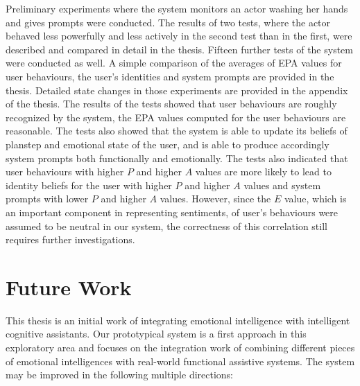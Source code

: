 Preliminary experiments where the system monitors an actor washing her hands and gives prompts were conducted. The results of two tests, where the actor behaved less powerfully and less actively in the second test than in the first, were described and compared in detail in the thesis. Fifteen further tests of the system were conducted as well. A simple comparison of the averages of EPA values for user behaviours, the user's identities and system prompts are provided in the thesis. Detailed state changes in those experiments are provided in the appendix of the thesis. The results of the tests showed that user behaviours are roughly recognized by the system, the EPA values computed for the user behaviours are reasonable. The tests also showed that the system is able to update its beliefs of planstep and emotional state of the user, and is able to produce accordingly system prompts both functionally and emotionally. The tests also indicated that user behaviours with higher $P$ and higher $A$ values are more likely to lead to identity beliefs for the user with higher $P$ and higher $A$ values and system prompts with lower $P$ and higher $A$ values. However, since the $E$ value, which is an important component in representing sentiments, of user's behaviours were assumed to be neutral in our system, the correctness of this correlation still requires further investigations.

\section{Future Work}

This thesis is an initial work of integrating emotional intelligence with intelligent cognitive assistants. Our prototypical system is a first approach in this exploratory area and focuses on the integration work of combining different pieces of emotional intelligences with real-world functional assistive systems. The system may be improved in the following multiple directions:

